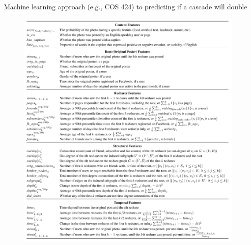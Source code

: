 \documentclass[aspectratio=169]{beamer}
\begin{document}
\begin{frame}

Machine learning approach (e.g., COS 424) to predicting if a cascade will double\\
\pause
\begin{figure}
  \centering
  \includegraphics[height=0.85\textheight]{figures/cheng_cascades_2014_tab1.png}
\end{figure}


\end{frame}
\end{document}
